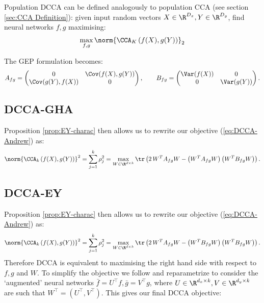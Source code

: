 Population DCCA \cite{andrew2013deep} can be defined analogously to population CCA (see section \ref{sec:CCA Definition}):
given input random vectors $X \in \R^{D_x}, Y \in \R^{D_y}$, find neural networks $f,g$ maximising:
\begin{align}\label{eq:DCCA-Andrew}
    \max_{f,g}  \norm{\CCA_K\left(f(X),g(Y)\right)}_2
\end{align}

The GEP formulation becomes:
\begin{equation*}
    A_{fg} = \begin{pmatrix} 0 &\Cov(f(X),g(Y)) \\ \Cov(g(Y),f(X)) & 0 \end{pmatrix}, \qquad
	B_{fg} = \begin{pmatrix}\Var(f(X)) & 0 \\ 0 & \Var(g(Y)) \end{pmatrix}.
\end{equation*}

\subsection{DCCA-GHA}

Proposition \ref{prop:EY-charac} then allows us to rewrite our objective (\ref{eq:DCCA-Andrew}) as:
\begin{align*}
    \norm{\CCA_k\left(f(X),g(Y)\right)}^2 
    = \sum_{j=1}^k \rho_j^2 
    = \max_{W \in \R^{d \times k}} \tr \left( 2\, W^T A_{fg} W - \left(W^T A_{fg} W\right) \left(W^T B_{fg} W\right) \right).
\end{align*}

\subsection{DCCA-EY}

Proposition \ref{prop:EY-charac} then allows us to rewrite our objective (\ref{eq:DCCA-Andrew}) as:
\begin{align*}
    \norm{\CCA_k\left(f(X),g(Y)\right)}^2 
    = \sum_{j=1}^k \rho_j^2 
    = \max_{W \in \R^{d \times k}} \tr \left( 2\, W^T A_{fg} W - \left(W^T B_{fg} W\right) \left(W^T B_{fg} W\right) \right).
\end{align*}
Therefore DCCA is equivalent to maximising the right hand side with respect to $f,g$ and $W$. To simplify the objective we follow \cite{wang2015stochastic} and reparametrize to consider the `augmented' neural networks $\bar{f} = U^{\top} f, \bar{g} = V^{\top} g$, where $U\in \R^{d_x \times k}, V\in \R^{d_y \times k}$ are such that $W^{\top} = (U^{\top}, V^{\top})$. This gives our final DCCA objective:

